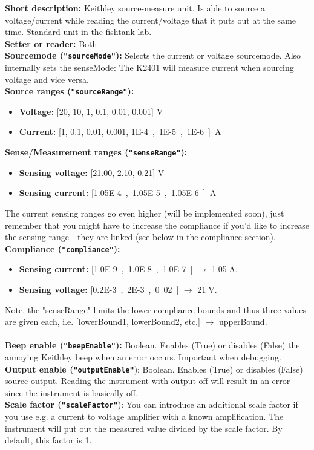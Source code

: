 \textbf{\textsf{Short description}:} Keithley source-measure unit. Is able to source a voltage/current while reading the current/voltage that it puts out at the same time. Standard unit in the fishtank lab.\\
\textbf{\textsf{Setter or reader}:} Both\\
\textbf{\textsf{Sourcemode} (\texttt{"sourceMode"}):} Selects the current or voltage sourcemode. Also internally sets the senseMode: The K2401 will measure current when sourcing voltage and vice versa.\\
\textbf{\textsf{Source ranges} (\texttt{"sourceRange"}):}
\begin{itemize}[noitemsep]
\item \textbf{\textsf{Voltage:}} [20, 10, 1, 0.1, 0.01, 0.001] V\\
\item \textbf{\textsf{Current:}} [1, 0.1, 0.01, 0.001, \SI{1E-4}, \SI{1E-5}, \SI{1E-6}] A\\
\end{itemize}
\textbf{\textsf{Sense/Measurement ranges} (\texttt{"senseRange"}):}
\begin{itemize}[noitemsep]
\item \textbf{\textsf{Sensing voltage:}} [21.00, 2.10, 0.21] V\\
\item \textbf{\textsf{Sensing current:}} [\SI{1.05E-4}, \SI{1.05E-5}, \SI{1.05E-6}] A
\end{itemize}
The current sensing ranges go even higher (will be implemented soon), just remember that you might have to increase the compliance if you'd like to increase the sensing range - they are linked (see below in the compliance section).\\
\textbf{\textsf{Compliance} (\texttt{"compliance"}):}
\begin{itemize}[noitemsep]
\item \textbf{\textsf{Sensing current:}} [\SI{1.0E-9}, \SI{1.0E-8}, \SI{1.0E-7}] $\rightarrow$ 1.05$\;$A. \\
\item \textbf{\textsf{Sensing voltage:}} [\SI{0.2E-3}, \SI{2E-3}, 0.02] $\rightarrow$ 21$\;$V.\\
\end{itemize}
Note, the "senseRange" limits the lower compliance bounds and thus three values are given each, i.e. [lowerBound1, lowerBound2, etc.] $\rightarrow$ upperBound.\\
\\
\textbf{\textsf{Beep enable} (\texttt{"beepEnable"}):} Boolean. Enables (True) or disables (False) the annoying Keithley beep when an error occurs. Important when debugging.\\
\textbf{\textsf{Output enable} (\texttt{"outputEnable"}}): Boolean. Enables (True) or disables (False) source output. Reading the instrument with output off will result in an error since the instrument is basically off.\\
\textbf{\textsf{Scale factor} (\texttt{"scaleFactor"}}): You can introduce an additional scale factor if you use e.g. a current to voltage amplifier with a known amplification. The instrument will put out the measured value divided by the scale factor. By default, this factor is 1.

